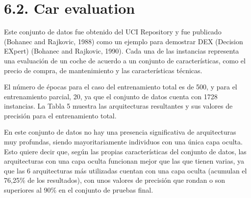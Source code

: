 \documentclass[spanish,a4paper,12pt,twoside]{report}
\begin{document}
  \section*{\Large 6.2. Car evaluation}
  Este conjunto de datos fue obtenido del UCI Repository y fue publicado (Bohanec and Rajkovic, 1988) como un ejemplo para demostrar DEX (Decision EXpert) (Bohanec and Rajkovic, 1990). Cada una de las instancias representa una evaluación de un coche de acuerdo a un conjunto de características, como el precio de compra, de mantenimiento y las características técnicas. \par
  El número de épocas para el caso del entrenamiento total es de 500, y para el entrenamiento parcial, 20, ya que el conjunto de datos cuenta con 1728 instancias. La Tabla 5 muestra las arquitecturas resultantes y sus valores de precisión para el entrenamiento total. \par
  En este conjunto de datos no hay una presencia significativa de arquitecturas muy profundas, siendo mayoritariamente individuos con una única capa oculta. Esto quiere decir que, según las propias características del conjunto de datos, las arquitecturas con una capa oculta funcionan mejor que las que tienen varias, ya que las 6 arquitecturas más utilizadas cuentan con una capa oculta (acumulan el 76,25\% de los resultados), con unos valores de precisión que rondan o son superiores al 90\% en el conjunto de pruebas final. \par
\end{document}
